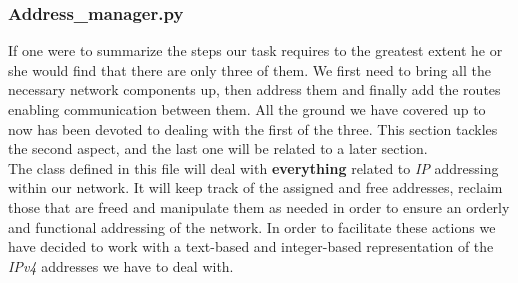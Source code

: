 \subsubsection{Address\_manager.py}
    If one were to summarize the steps our task requires to the greatest extent he or she would find that there are only three of them. We first need to bring all the necessary network components up, then address them and finally add the routes enabling communication between them. All the ground we have covered up to now has been devoted to dealing with the first of the three. This section tackles the second aspect, and the last one will be related to a later section.\\

    The class defined in this file will deal with \textbf{everything} related to \textit{IP} addressing within our network. It will keep track of the assigned and free addresses, reclaim those that are freed and manipulate them as needed in order to ensure an orderly and functional addressing of the network. In order to facilitate these actions we have decided to work with a text-based and integer-based representation of the \textit{IPv4} addresses we have to deal with.\\

